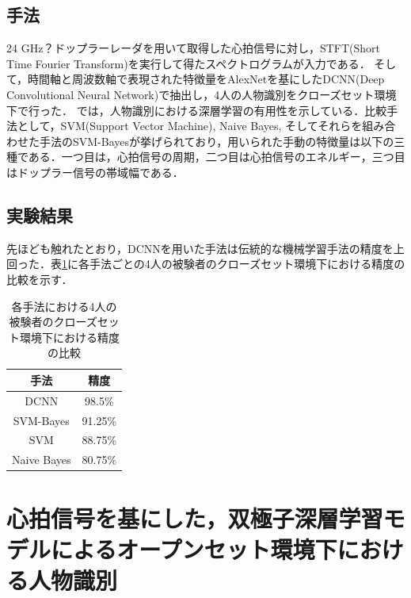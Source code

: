 \subsection{手法}
24 GHz？ドップラーレーダを用いて取得した心拍信号に対し，STFT(Short Time Fourier Transform)を実行して得たスペクトログラムが入力である．
そして，時間軸と周波数軸で表現された特徴量をAlexNetを基にしたDCNN(Deep Convolutional Neural Network)で抽出し，4人の人物識別をクローズセット環境下で行った．
\cite{paper:HeartID}では，人物識別における深層学習の有用性を示している．比較手法として，SVM(Support Vector Machine), Naive Bayes, そしてそれらを組み合わせた手法のSVM-Bayesが挙げられており，用いられた手動の特徴量は以下の三種である．一つ目は，心拍信号の周期，二つ目は心拍信号のエネルギー，三つ目はドップラー信号の帯域幅である．

\subsection{実験結果}
先ほども触れたとおり，DCNNを用いた手法は伝統的な機械学習手法の精度を上回った．表\ref{table:HeartID}に各手法ごとの4人の被験者のクローズセット環境下における精度の比較を示す．

\begin{table}[H]
\caption{各手法における4人の被験者のクローズセット環境下における精度の比較}
\centering
\begin{tabular}{cc}
\hline
手法 & 精度 \\
\hline
DCNN & 98.5\% \\
SVM-Bayes & 91.25\% \\
SVM & 88.75\% \\
Naive Bayes & 80.75\% \\
\hline
\end{tabular}
\label{table:HeartID}
\end{table}

\section{心拍信号を基にした，双極子深層学習モデルによるオープンセット環境下における人物識別\cite{paper:HeartSignature}}
